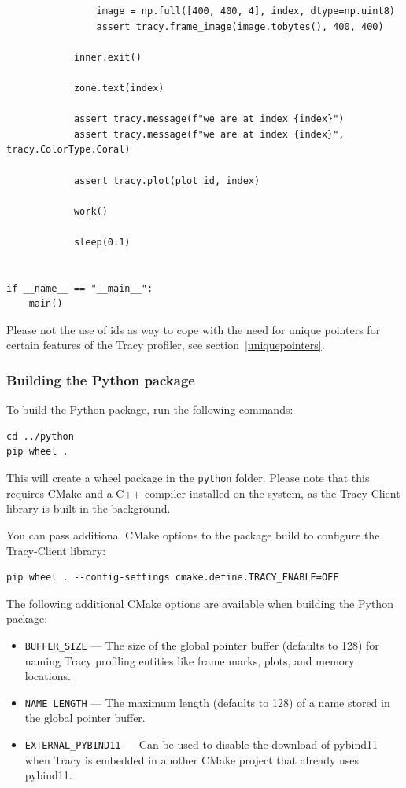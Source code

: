 \documentclass[hidelinks,titlepage,a4paper,twoside]{article}
\begin{document}
\begin{lstlisting}
                image = np.full([400, 400, 4], index, dtype=np.uint8)
                assert tracy.frame_image(image.tobytes(), 400, 400)

            inner.exit()

            zone.text(index)

            assert tracy.message(f"we are at index {index}")
            assert tracy.message(f"we are at index {index}", tracy.ColorType.Coral)

            assert tracy.plot(plot_id, index)

            work()

            sleep(0.1)


if __name__ == "__main__":
    main()
\end{lstlisting}

Please not the use of ids as way to cope with the need for unique pointers for certain features of the Tracy profiler, see section~\ref{uniquepointers}.

\subsubsection{Building the Python package}

To build the Python package, run the following commands:

\begin{lstlisting}
cd ../python
pip wheel .
\end{lstlisting}

This will create a wheel package in the \texttt{python} folder.
Please note that this requires CMake and a C++ compiler installed on the system, as the Tracy-Client library is built in the background.

You can pass additional CMake options to the package build to configure the Tracy-Client library:
\begin{lstlisting}
pip wheel . --config-settings cmake.define.TRACY_ENABLE=OFF
\end{lstlisting}

The following additional CMake options are available when building the Python package:

\begin{itemize}
\item \texttt{BUFFER\_SIZE} --- The size of the global pointer buffer (defaults to 128) for naming Tracy profiling entities like frame marks, plots, and memory locations.
\item \texttt{NAME\_LENGTH} --- The maximum length (defaults to 128) of a name stored in the global pointer buffer.
\item \texttt{EXTERNAL\_PYBIND11} --- Can be used to disable the download of pybind11 when Tracy is embedded in another CMake project that already uses pybind11.
\end{itemize}
\end{document}

